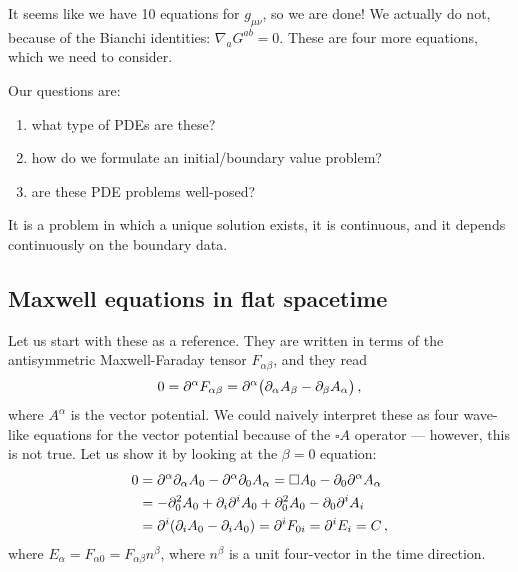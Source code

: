 \documentclass[main.tex]{subfiles}
\begin{document}
It seems like we have 10 equations for \(g_{\mu \nu }\), so we are done! We actually do not, because of the Bianchi identities: \(\nabla_{a} G^{ab} = 0\). These are four more equations, which we need to consider. 

Our questions are: 
\begin{enumerate}
    \item what type of PDEs are these?
    \item how do we formulate an initial/boundary value problem?
    \item are these PDE problems well-posed?
\end{enumerate}

\begin{definition}
It is a problem in which a unique solution exists, it is continuous, and it depends continuously on the boundary data. 
\end{definition}

\subsection{Maxwell equations in flat spacetime}

Let us start with these as a reference. They are written in terms of the antisymmetric Maxwell-Faraday tensor \(F_{\alpha \beta }\), and they read 
%
\begin{align}
0 = \partial^{\alpha } F_{\alpha \beta } = \partial^{\alpha } \qty( \partial_{\alpha} A_\beta - \partial_{\beta } A_\alpha ) 
\,,
\end{align}
%
where \(A^{\alpha }\) is the vector potential.
We could naively interpret these as four wave-like equations for the vector potential because of the \(\square A\) operator 
--- however, this is not true. 
Let us show it by looking at the \(\beta = 0\) equation: 
%
\begin{align}
0 &= \partial^{\alpha } \partial_{\alpha } A_0 - \partial^{\alpha } \partial_0 A_\alpha = \square A_0 - \partial_0 \partial^{\alpha } A_\alpha   \\
&= - \partial_0^2 A_0 + \partial_{i} \partial^{i} A_0 + \partial_0^2 A_0 - \partial_0 \partial^{i} A_i  \\
&= \partial^{i} \qty(\partial_{i} A_0 - \partial_{i} A_0 ) = \partial^{i} F_{0i} = \partial^{i} E_i = C
\,,
\end{align}
%
where \(E_\alpha = F_{\alpha 0} = F_{\alpha \beta } n^\beta \), where \(n^{\beta }\) is a unit four-vector in the time direction.
\end{document}
